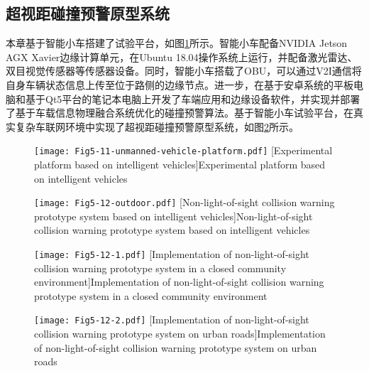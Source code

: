 \subsection{超视距碰撞预警原型系统}

本章基于智能小车搭建了试验平台，如图\ref{fig 5-10}所示。智能小车配备NVIDIA Jetson AGX Xavier边缘计算单元，在Ubuntu 18.04操作系统上运行，并配备激光雷达、双目视觉传感器等传感器设备。同时，智能小车搭载了OBU，可以通过V2I通信将自身车辆状态信息上传至位于路侧的边缘节点。进一步，在基于安卓系统的平板电脑和基于Qt5平台的笔记本电脑上开发了车端应用和边缘设备软件，并实现并部署了基于车载信息物理融合系统优化的碰撞预警算法。基于智能小车试验平台，在真实复杂车联网环境中实现了超视距碰撞预警原型系统，如图\ref{fig 5-11}所示。

\begin{figure}[h]
\centering
  \texttt{[image: Fig5-11-unmanned-vehicle-platform.pdf]}
  [Experimental platform based on intelligent vehicles]{Experimental platform based on intelligent vehicles}
  \label{fig 5-10}
\end{figure}

\begin{figure}[h]
\centering
  \texttt{[image: Fig5-12-outdoor.pdf]}
  [Non-light-of-sight collision warning prototype system based on intelligent vehicles]{Non-light-of-sight collision warning prototype system based on intelligent vehicles}
  \label{fig 5-11}
\end{figure}

\begin{figure}[h] 
	\centering
	\texttt{[image: Fig5-12-1.pdf]}
	[Implementation of non-light-of-sight collision warning prototype system in a closed community environment]{Implementation of non-light-of-sight collision warning prototype system in a closed community environment}
	\label{fig 5-12-1}
\end{figure}

\begin{figure}[h] 
	\centering
	\texttt{[image: Fig5-12-2.pdf]}
	[Implementation of non-light-of-sight collision warning prototype system on urban roads]{Implementation of non-light-of-sight collision warning prototype system on urban roads}
	\label{fig 5-12-2}
\end{figure}

